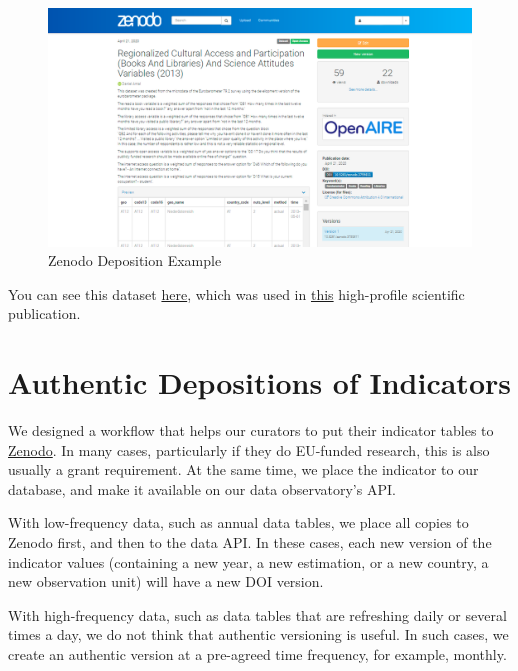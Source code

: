 \documentclass[
  a4paper,
  openany, a4paper, oneside]{book}
\begin{document}
\begin{figure}

{\centering \includegraphics[width=15.35in]{plots/screenshots/zenodo_deposition_example} 

}

\caption{Zenodo Deposition Example}\label{fig:zenodo-example}
\end{figure}

You can see this dataset \href{https://zenodo.org/record/3759811\#.YJ6R3qgzbIU}{here}, which was used in \href{https://dataandlyrics.com/publication/scholarly_pirate_libraries_2020/}{this} high-profile scientific publication.

\hypertarget{deposit-indicator}{%
\section{Authentic Depositions of Indicators}\label{deposit-indicator}}

We designed a workflow that helps our curators to put their indicator tables to \href{https://zenodo.org/}{Zenodo}. In many cases, particularly if they do EU-funded research, this is also usually a grant requirement. At the same time, we place the indicator to our database, and make it available on our data observatory's API.

With low-frequency data, such as annual data tables, we place all copies to Zenodo first, and then to the data API. In these cases, each new version of the indicator values (containing a new year, a new estimation, or a new country, a new observation unit) will have a new DOI version.

With high-frequency data, such as data tables that are refreshing daily or several times a day, we do not think that authentic versioning is useful. In such cases, we create an authentic version at a pre-agreed time frequency, for example, monthly.
\end{document}
